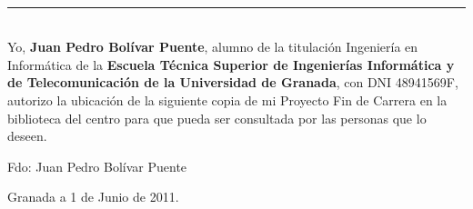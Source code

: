 
\thispagestyle{empty}
\cleardoublepage

\thispagestyle{empty}


\cleardoublepage
\thispagestyle{empty}
\begin{center}
{\large\bfseries \myTitle}\\
\end{center}
\begin{center}
\myName
\end{center}
\\
\vspace{0.7cm}

\\

\cleardoublepage
\thispagestyle{empty}
\begin{center}
{\large\bfseries \myTitle}\\
\end{center}
\begin{center}
\myName
\end{center}
\\
\vspace{0.7cm}

\\


\cleardoublepage
\thispagestyle{empty}
\noindent\rule[-1ex]{\textwidth}{2pt}\\[4.5ex]

Yo, \textbf{Juan Pedro Bolívar Puente}, alumno de la titulación
Ingeniería en Informática de la \textbf{Escuela Técnica Superior de
  Ingenierías Informática y de Telecomunicación de la Universidad de
  Granada}, con DNI 48941569F, autorizo la ubicación de la siguiente
copia de mi Proyecto Fin de Carrera en la biblioteca del centro para
que pueda ser consultada por las personas que lo deseen.

\vspace{6cm}
\noindent Fdo: Juan Pedro Bolívar Puente

\vspace{2cm}

\begin{flushright}
Granada a 1 de Junio de 2011.
\end{flushright}


